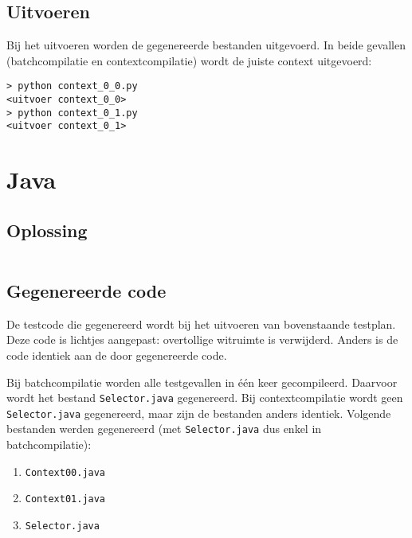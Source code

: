 \inputminted{python}{sources/echo/context_0_1.py}

\subsection{Uitvoeren}\label{subsec:echo-python-uitvoeren}

Bij het uitvoeren worden de gegenereerde bestanden uitgevoerd.
In beide gevallen (batchcompilatie en contextcompilatie) wordt de juiste context uitgevoerd:

\begin{verbatim}
> python context_0_0.py
<uitvoer context_0_0>
> python context_0_1.py
<uitvoer context_0_1>
\end{verbatim}

\section{Java}\label{sec:echo-java}

\subsection{Oplossing}\label{subsec:echo-java-oplossing}

\inputminted{java}{sources/echo/correct.java}

\subsection{Gegenereerde code}\label{subsec:echo-java-gegenereerde-code}

De testcode die gegenereerd wordt bij het uitvoeren van bovenstaande testplan.
Deze code is lichtjes aangepast: overtollige witruimte is verwijderd.
Anders is de code identiek aan de door \tested{} gegenereerde code.

Bij batchcompilatie worden alle testgevallen in één keer gecompileerd.
Daarvoor wordt het bestand \texttt{Selector.java} gegenereerd.
Bij contextcompilatie wordt geen \texttt{Selector.java} gegenereerd, maar zijn de bestanden anders identiek.
Volgende bestanden werden gegenereerd (met \texttt{Selector.java} dus enkel in batchcompilatie):

\begin{enumerate}
    \item \texttt{Context00.java}
    \item \texttt{Context01.java}
    \item \texttt{Selector.java}
\end{enumerate}

